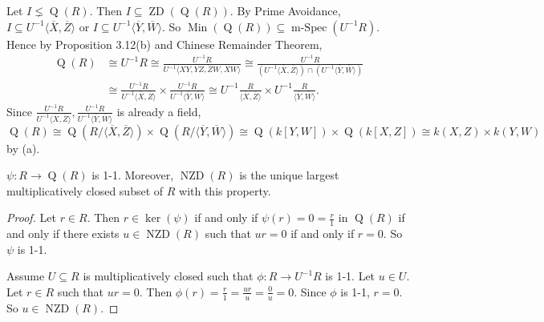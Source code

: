 \begin{example*}
\begin{enumerate}
            Let $I \lneq \operatorname{Q}(R)$. Then $I \subseteq \operatorname{ZD}(\operatorname{Q}(R))$. By Prime Avoidance, $I \subseteq U^{-1}\langle \overbar{X}, \overbar{Z} \rangle$ or $I \subseteq U^{-1} \langle \overbar{Y}, \overbar{W} \rangle$. So $ \operatorname{Min}(\operatorname{Q}(R)) \subseteq \operatorname{m-Spec}(U^{-1}R)$. Hence by Proposition 3.12(b) and Chinese Remainder Theorem,
            \begin{align*}
                \operatorname{Q}(R) &\cong U^{-1}R \cong \frac{U^{-1}R}{U^{-1}\langle \overbar{XY,YZ,ZW,XW} \rangle} \cong \frac{U^{-1}R}{(U^{-1}\langle \overbar{X},\overbar{Z} \rangle) \cap (U^{-1}\langle \overbar{Y},\overbar{W} \rangle)} \\
                &\cong \frac{U^{-1}R}{U^{-1} \langle \overbar{X}, \overbar{Z} \rangle} \times \frac{U^{-1}R}{U^{-1} \langle \overbar{Y}, \overbar{W} \rangle} \cong U^{-1}\frac{R}{\langle \overbar{X}, \overbar{Z} \rangle} \times U^{-1} \frac{R}{\langle \overbar{Y}, \overbar{W} \rangle}.
            \end{align*}
            Since $\frac{U^{-1}R}{U^{-1}\langle \overbar{X}, \overbar{Z}\rangle}, \frac{U^{-1}R}{U^{-1}\langle \overbar{Y}, \overbar{W} \rangle}$ is already a field, $\operatorname{Q}(R) \cong \operatorname{Q}(R/\langle \overbar{X}, \overbar{Z} \rangle) \times \operatorname{Q}(R/\langle \overbar{Y}, \overbar{W} \rangle) \cong \operatorname{Q}(k[Y,W]) \times \operatorname{Q}(k[X,Z]) \cong k(X,Z) \times k(Y,W)$ by (a).
    \end{enumerate}
\end{example*}

\begin{proposition}
    $\psi: R \to \operatorname{Q}(R)$ is 1-1. Moreover, $\operatorname{NZD}(R)$ is the unique largest multiplicatively closed subset of $R$ with this property.
\end{proposition}

\begin{proof}
    Let $r \in R$. Then $r \in \ker(\psi)$ if and only if $\psi(r) = 0 = \frac{r}{1}$ in $\operatorname{Q}(R)$ if and only if there exists $u \in \operatorname{NZD}(R)$ such that $ur = 0$ if and only if $r = 0$. So $\psi$ is 1-1. \par
    Assume $U \subseteq R$ is multiplicatively closed such that $\phi: R \to U^{-1}R$ is 1-1. Let $u \in U$. Let $r \in R$ such that $ur = 0$. Then $\phi(r) = \frac{r}{1} = \frac{ur}{u} = \frac{0}{u} = 0$. Since $\phi$ is 1-1, $r = 0$. So $u \in \operatorname{NZD}(R)$.
\end{proof}


